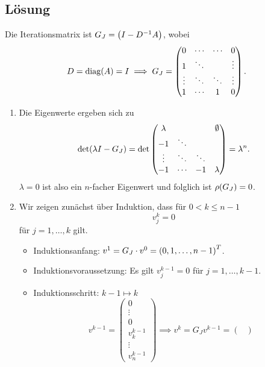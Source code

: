 \documentclass{exercise}
\begin{document}
    \subsection*{Lösung}
    Die Iterationsmatrix ist \(G_J = \parentheses*{I - D^{-1}A}\), wobei
    \[
        D = \diag\parentheses*{A} = I \implies G_J = \begin{pmatrix}
            0 & \cdots & \cdots & 0\\
            1 & \ddots & & \vdots\\
            \vdots & \ddots & \ddots & \vdots\\
            1 & \cdots & 1 & 0
        \end{pmatrix}.
    \]
    \begin{enumerate}
        \item Die Eigenwerte ergeben sich zu
        \[
            \det\parentheses*{\lambda I - G_J} = \det\begin{pmatrix}
                \lambda & & & \emptyset\\
                -1 & \ddots & &\\
                \vdots & \ddots & \ddots &\\
                -1 & \cdots & -1 & \lambda
            \end{pmatrix} = \lambda^n.
        \]
        \(\lambda = 0\) ist also ein \(n\)-facher Eigenwert und folglich ist \(\rho\parentheses*{G_J} = 0\).
        \item Wir zeigen zunächst über Induktion, dass für \(0 < k \le n - 1\)
        \[
            v_j^k = 0
        \]
        für \(j = 1, \ldots, k\) gilt.
        \begin{itemize}
            \item Induktionsanfang: \(v^1 = G_J \cdot v^0 = \parentheses*{0, 1, \ldots, n - 1}^T\).
            \item Induktionsvoraussetzung: Es gilt \(v_j^{k - 1} = 0\) für \(j = 1, \ldots, k - 1\).
            \item Induktionsschritt: \(k - 1 \mapsto k\)
            \[
                v^{k - 1} = \begin{pmatrix}
                    0\\
                    \vdots\\
                    0\\
                    v_k^{k - 1}\\
                    \vdots\\
                    v_n^{k - 1}
                \end{pmatrix} \implies v^k = G_J v^{k - 1} = \begin{pmatrix}

\end{pmatrix}\]
\end{itemize}
\end{enumerate}
\end{document}
